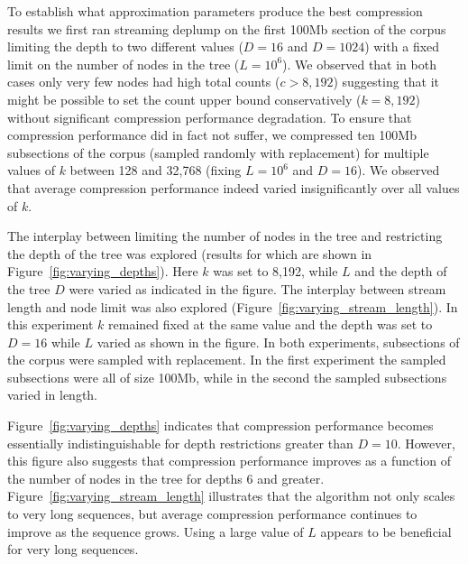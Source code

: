 To establish what approximation parameters produce the best compression results we first ran streaming deplump on the first 100Mb section of the corpus limiting the depth to two different values ($D=16$ and $D=1024$) with a fixed limit on the number of nodes in the tree ($L=10^6$).  We observed that in both cases only very few nodes had high total counts ($c > 8,192$) suggesting that it might be possible to set the count upper bound conservatively ($k= 8,192$) without significant compression performance degradation.  %
To ensure that compression performance did in fact not suffer, we compressed ten 100Mb subsections of the corpus (sampled randomly with replacement) for multiple values of $k$ between 128 and 32,768 (fixing $L=10^6$ and $D=16$).  We observed that average compression performance indeed varied insignificantly over all values of $k$.

The interplay between limiting the number of nodes in the tree and restricting the depth of the tree was explored (results for which are shown in Figure~\ref{fig:varying_depths}).  Here $k$ was set to 8,192, while $L$ and the depth of the tree $D$ were varied as indicated in the figure.  The interplay between stream length and node limit was also explored (Figure~\ref{fig:varying_stream_length}).  In this experiment $k$ remained fixed at the same value and the depth was set to $D=16$ while $L$ varied as shown in the figure.  
 In both experiments, subsections of the corpus were sampled with replacement.  In the first experiment the sampled subsections were all of size 100Mb, while in the second the sampled subsections varied in length.

Figure~\ref{fig:varying_depths} indicates that compression performance becomes essentially indistinguishable for depth restrictions greater than $D=10$.  However, this figure also suggests that compression performance improves as a function of the number of nodes in the tree for depths 6 and greater.  Figure~\ref{fig:varying_stream_length} illustrates that the algorithm not only scales to very long sequences, but average compression performance continues to improve as the sequence grows.  Using a large value of $L$ appears to be beneficial for very long sequences.

